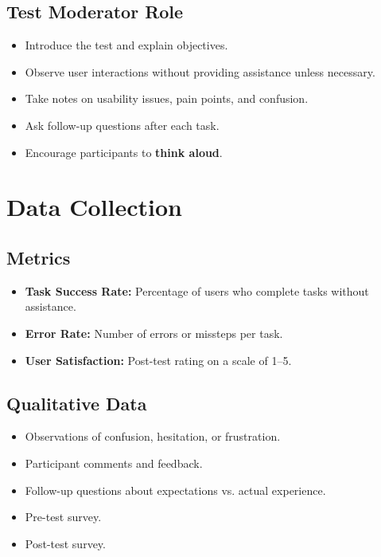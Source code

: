 \documentclass[12pt, titlepage]{article}
\begin{document}
\subsection*{Test Moderator Role}
\begin{itemize}
  \item Introduce the test and explain objectives.
  \item Observe user interactions without providing assistance unless necessary.
  \item Take notes on usability issues, pain points, and confusion.
  \item Ask follow-up questions after each task.
  \item Encourage participants to \textbf{think aloud}.
\end{itemize}

\section*{Data Collection}
\subsection*{Metrics}
\begin{itemize}
  \item \textbf{Task Success Rate:} Percentage of users who complete
    tasks without assistance.
  \item \textbf{Error Rate:} Number of errors or missteps per task.
  \item \textbf{User Satisfaction:} Post-test rating on a scale of 1–5.
\end{itemize}

\subsection*{Qualitative Data}
\begin{itemize}
  \item Observations of confusion, hesitation, or frustration.
  \item Participant comments and feedback.
  \item Follow-up questions about expectations vs. actual experience.
  \item Pre-test survey.
  \item Post-test survey.
\end{itemize}
\end{document}
